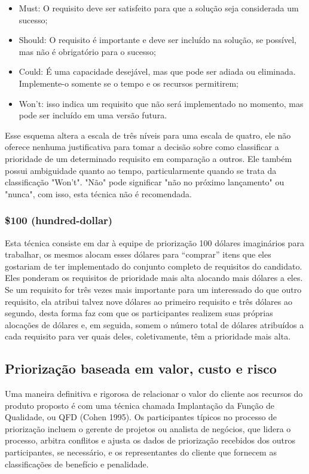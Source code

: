 \documentclass[runningheads]{llncs}
\begin{document}
\begin{itemize}
    \item Must: O requisito deve ser satisfeito para que a solução seja considerada um sucesso;
    \item Should: O requisito é importante e deve ser incluído na solução, se possível, mas não é obrigatório para o sucesso;
    \item Could: É uma capacidade desejável, mas que pode ser adiada ou eliminada. Implemente-o somente se o tempo e os recursos permitirem;
    \item Won't: isso indica um requisito que não será implementado no momento, mas pode ser incluído em uma versão futura. 
\end{itemize}

Esse esquema altera a escala de três níveis para uma escala de quatro, ele não oferece nenhuma justificativa para tomar a decisão sobre como classificar a prioridade de um determinado requisito em comparação a outros. Ele também possui ambiguidade quanto ao tempo, particularmente quando se trata da classificação "Won't". "Não" pode significar "não no próximo lançamento" ou "nunca", com isso, esta técnica não é recomendada.

\subsubsection{\$100 (hundred-dollar)}
Esta técnica consiste em dar à equipe de priorização 100 dólares imaginários para trabalhar, os mesmos alocam esses dólares para “comprar” itens que eles gostariam de ter implementado do conjunto completo de requisitos do candidato. Eles ponderam os requisitos de prioridade mais alta alocando mais dólares a eles. Se um requisito for três vezes mais importante para um interessado do que outro requisito, ela atribui talvez nove dólares ao primeiro requisito e três dólares ao segundo, desta forma faz com que os participantes realizem suas próprias alocações de dólares e, em seguida, somem o número total de dólares atribuídos a cada requisito para ver quais deles, coletivamente, têm a prioridade mais alta.

\subsection{Priorização baseada em valor, custo e risco}

Uma maneira definitiva e rigorosa de relacionar o valor do cliente aos recursos do produto proposto é com uma técnica chamada Implantação da Função de Qualidade, ou QFD (Cohen 1995). 
Os participantes típicos no processo de priorização incluem o gerente de projetos ou analista de negócios, que lidera o processo, arbitra conflitos e ajusta os dados de priorização recebidos dos outros participantes, se necessário, e os representantes do cliente que fornecem as classificações de benefício e penalidade.
\end{document}
